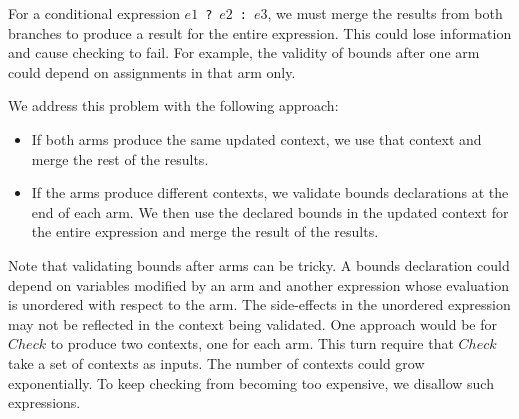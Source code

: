 For a conditional expression $e1$~\lstinline+?+~$e2$~\lstinline+:+~$e3$, we must
merge the results from both branches to produce a result for the entire expression.
This could lose information and cause checking to fail. For example,  the validity of bounds after
one arm could depend on assignments in that arm only.

We address this problem with the following approach:
\begin{itemize}
\item  If both arms produce the same updated context, we use that context
and merge the rest of the results.
\item If the arms produce different
contexts, we validate bounds declarations at the end of each arm.  We then
use the declared bounds in the updated context for the entire expression
and merge the result of the results.
\end{itemize}

Note that validating bounds after arms can be tricky.
A bounds declaration could depend on variables modified by an arm
and another expression whose evaluation is unordered with respect to the arm.
The side-effects in the unordered expression may not be reflected in the
context being validated.
One approach would be for $Check$ to produce two contexts,
one for each arm. This turn require that $Check$ take a set of contexts as
 inputs.  The number of contexts could grow exponentially.
To keep checking from becoming too expensive, we disallow such expressions.

